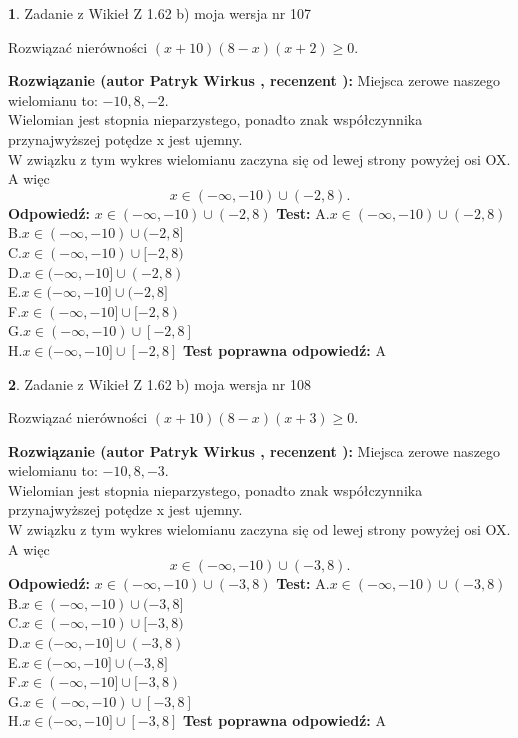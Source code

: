 \documentclass[12pt, a4paper]{article}
\theoremstyle{definition} %
\newtheorem{zad}{}
\newcommand{\zadStart}[1]{\begin{zad}#1\newline}
\newcommand{\zadStop}{\end{zad}}
\newcommand{\rozwStart}[2]{\noindent \textbf{Rozwiązanie (autor #1 , recenzent #2): }\newline}
\newcommand{\rozwStop}{\newline}
\newcommand{\odpStart}{\noindent \textbf{Odpowiedź:}\newline}
\newcommand{\odpStop}{\newline}
\newcommand{\testStart}{\noindent \textbf{Test:}\newline}
\newcommand{\testStop}{\newline}
\newcommand{\kluczStart}{\noindent \textbf{Test poprawna odpowiedź:}\newline}
\newcommand{\kluczStop}{\newline}
\begin{document}
\zadStart{Zadanie z Wikieł Z 1.62 b) moja wersja nr 107}

Rozwiązać nierówności $(x+10)(8-x)(x+2)\ge0$.
\zadStop
\rozwStart{Patryk Wirkus}{}
Miejsca zerowe naszego wielomianu to: $-10, 8, -2$.\\
Wielomian jest stopnia nieparzystego, ponadto znak współczynnika przy\linebreak najwyższej potędze x jest ujemny.\\ W związku z tym wykres wielomianu zaczyna się od lewej strony powyżej osi OX. A więc $$x \in (-\infty,-10) \cup (-2,8).$$
\rozwStop
\odpStart
$x \in (-\infty,-10) \cup (-2,8)$
\odpStop
\testStart
A.$x \in (-\infty,-10) \cup (-2,8)$\\
B.$x \in (-\infty,-10) \cup (-2,8]$\\
C.$x \in (-\infty,-10) \cup [-2,8)$\\
D.$x \in (-\infty,-10] \cup (-2,8)$\\
E.$x \in (-\infty,-10] \cup (-2,8]$\\
F.$x \in (-\infty,-10] \cup [-2,8)$\\
G.$x \in (-\infty,-10) \cup [-2,8]$\\
H.$x \in (-\infty,-10] \cup [-2,8]$
\testStop
\kluczStart
A
\kluczStop



\zadStart{Zadanie z Wikieł Z 1.62 b) moja wersja nr 108}

Rozwiązać nierówności $(x+10)(8-x)(x+3)\ge0$.
\zadStop
\rozwStart{Patryk Wirkus}{}
Miejsca zerowe naszego wielomianu to: $-10, 8, -3$.\\
Wielomian jest stopnia nieparzystego, ponadto znak współczynnika przy\linebreak najwyższej potędze x jest ujemny.\\ W związku z tym wykres wielomianu zaczyna się od lewej strony powyżej osi OX. A więc $$x \in (-\infty,-10) \cup (-3,8).$$
\rozwStop
\odpStart
$x \in (-\infty,-10) \cup (-3,8)$
\odpStop
\testStart
A.$x \in (-\infty,-10) \cup (-3,8)$\\
B.$x \in (-\infty,-10) \cup (-3,8]$\\
C.$x \in (-\infty,-10) \cup [-3,8)$\\
D.$x \in (-\infty,-10] \cup (-3,8)$\\
E.$x \in (-\infty,-10] \cup (-3,8]$\\
F.$x \in (-\infty,-10] \cup [-3,8)$\\
G.$x \in (-\infty,-10) \cup [-3,8]$\\
H.$x \in (-\infty,-10] \cup [-3,8]$
\testStop
\kluczStart
A
\kluczStop
\end{document}
